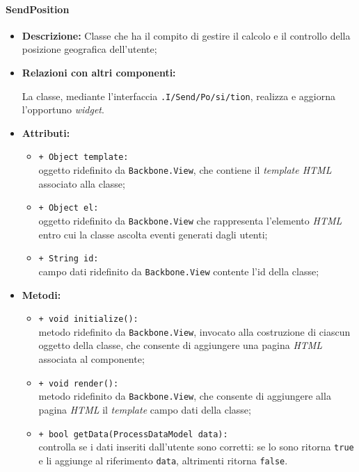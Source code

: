 \paragraph{SendPosition}
\label{sendPosition}
\begin{flushleft}
\begin{itemize}
\item \textbf{Descrizione:} Classe che ha il compito di gestire il calcolo e il controllo della posizione geografica dell'utente;
\item \textbf{Relazioni con altri componenti:}
\begin{sloppypar}
La classe, mediante l'interfaccia \texttt{\viewUser{}.I\fshyp{}Send\fshyp{}Po\fshyp{}si\fshyp{}tion}, realizza e aggiorna l'opportuno \textit{widget}.
\end{sloppypar}
\item \textbf{Attributi:}
\begin{sloppypar}
\begin{itemize}
\item \texttt{+ Object template:}\\ oggetto ridefinito da \texttt{Backbone.View}, che contiene il \textit{template HTML} associato alla classe;
\item \texttt{+ Object el:}\\ oggetto ridefinito da \texttt{Backbone.View} che rappresenta l'elemento \textit{HTML} entro cui la classe ascolta eventi generati dagli utenti;
\item \texttt{+ String id:}\\ campo dati ridefinito da \texttt{Backbone.View} contente l'id della classe;
\end{itemize}
\end{sloppypar}
\item \textbf{Metodi:}
\begin{sloppypar}
\begin{itemize}
\item \texttt{+ void initialize():}\\ metodo ridefinito da \texttt{Backbone.View}, invocato alla costruzione di ciascun oggetto della classe, che consente di aggiungere una pagina \textit{HTML} associata al componente;
\item \texttt{+ void render():}\\ metodo ridefinito da \texttt{Backbone.View}, che consente di aggiungere alla pagina \textit{HTML} il \textit{template} campo dati della classe;
\item \texttt{+ bool getData(ProcessDataModel data):}\\ controlla se i dati inseriti dall'utente sono corretti: se lo sono ritorna \texttt{true} e li aggiunge al riferimento \texttt{data}, altrimenti ritorna \texttt{false}.
\end{itemize}
\end{sloppypar}
\end{itemize}
\end{flushleft}

